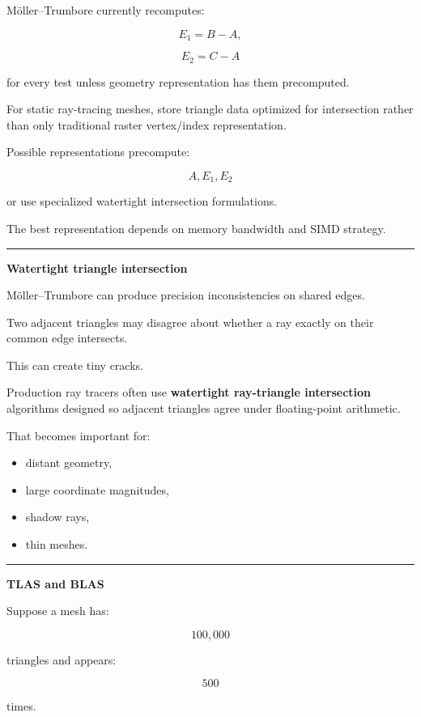 Möller--Trumbore currently recomputes:

\[
E_1=B-A,
\]

\[
E_2=C-A
\]

for every test unless geometry representation has them precomputed.

For static ray-tracing meshes, store triangle data optimized for intersection rather than only traditional raster vertex/index representation.

Possible representations precompute:

\[
A,
E_1,E_2
\]

or use specialized watertight intersection formulations.

The best representation depends on memory bandwidth and SIMD strategy.

\begin{center}\rule{0.5\linewidth}{0.5pt}\end{center}

\textbf{Watertight triangle intersection}

Möller--Trumbore can produce precision inconsistencies on shared edges.

Two adjacent triangles may disagree about whether a ray exactly on their common edge intersects.

This can create tiny cracks.

Production ray tracers often use \textbf{watertight ray-triangle intersection} algorithms designed so adjacent triangles agree under floating-point arithmetic.

That becomes important for:

\begin{itemize}
\tightlist
\item
  distant geometry,
\item
  large coordinate magnitudes,
\item
  shadow rays,
\item
  thin meshes.
\end{itemize}

\begin{center}\rule{0.5\linewidth}{0.5pt}\end{center}

\textbf{TLAS and BLAS}

Suppose a mesh has:

\[
100,000
\]

triangles and appears:

\[
500
\]

times.

